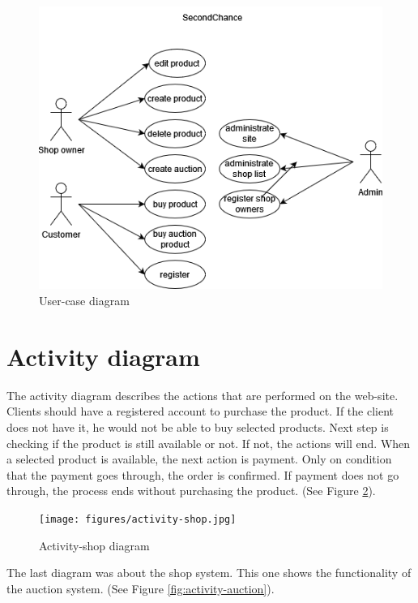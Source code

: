 \begin{figure}[h!]
    \centering
    \includegraphics[scale=0.6]{figures/user-case.png}
    \caption{User-case diagram}
    \label{fig:user-case}
\end{figure}
\clearpage


\section{Activity diagram}
The activity diagram describes the actions that are performed on the web-site. Clients should have a registered account to purchase the product. If the client does not have it, he would not be able to buy selected products. Next step is checking if the product is still available or not. If not, the actions will end. When a selected product is available, the next action is payment. Only on condition that the payment goes through, the order is confirmed. If payment does not go through, the process ends without purchasing the product. (See Figure \ref{fig:activity-shop}).

\begin{figure}[h!]
    \centering
    \texttt{[image: figures/activity-shop.jpg]}
    \caption{Activity-shop diagram}
    \label{fig:activity-shop}
\end{figure}
\clearpage

The last diagram was about the shop system. This one shows the functionality of the auction system. (See Figure \ref{fig:activity-auction}).

